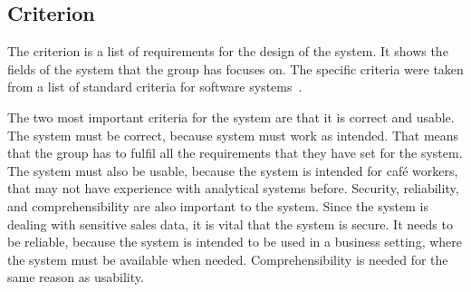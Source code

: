 \subsection{Criterion}\label{subsec:criterion}

The criterion is a list of requirements for the design of the system.
It shows the fields of the system that the group has focuses on.
The specific criteria were taken from a list of standard criteria for software systems~\cite[180]{mathiassen2018}. 

\begin{table}[H]
    \centering
\end{table}

The two most important criteria for the system are that it is correct and usable.
The system must be correct, because system must work as intended.
That means that the group has to fulfil all the requirements that they have set for the system.
The system must also be usable, because the system is intended for café workers, that may not have experience with
analytical systems before.
Security, reliability, and comprehensibility are also important to the system.
Since the system is dealing with sensitive sales data, it is vital that the system is secure.
It needs to be reliable, because the system is intended to be used in a business setting, where the system must be 
available when needed.
Comprehensibility is needed for the same reason as usability.

